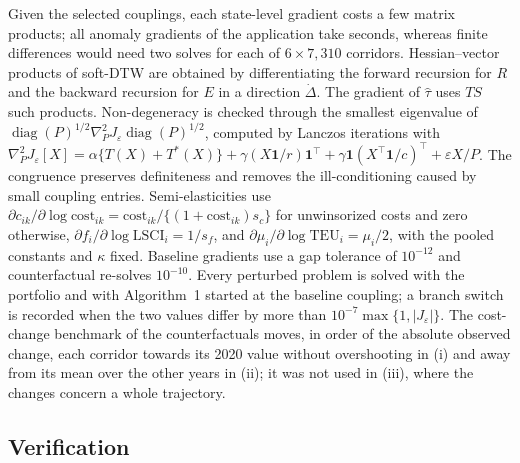 Given the selected couplings, each state-level gradient costs a few matrix products; all anomaly gradients of the application take seconds, whereas finite differences would need two solves for each of $6\times7{,}310$ corridors. Hessian--vector products of soft-DTW are obtained by differentiating the forward recursion for $R$ and the backward recursion for $E$ in a direction $\dot\Delta$. The gradient of $\hat\tau$ uses $TS$ such products. Non-degeneracy is checked through the smallest eigenvalue of $\operatorname{diag}(P)^{1/2}\nabla^2_PJ_\varepsilon\operatorname{diag}(P)^{1/2}$, computed by Lanczos iterations with $\nabla_P^2J_\varepsilon[X]=\alpha\{T(X)+T^\ast(X)\}+\gamma(X\mathbf 1/r)\mathbf 1^\top+\gamma\mathbf 1(X^\top\mathbf 1/c)^\top+\varepsilon X/P$. The congruence preserves definiteness and removes the ill-conditioning caused by small coupling entries. Semi-elasticities use $\partial c_{ik}/\partial\log\mathrm{cost}_{ik}=\mathrm{cost}_{ik}/\{(1+\mathrm{cost}_{ik})s_c\}$ for unwinsorized costs and zero otherwise, $\partial f_i/\partial\log\mathrm{LSCI}_i=1/s_f$, and $\partial\mu_i/\partial\log\mathrm{TEU}_i=\mu_i/2$, with the pooled constants and $\kappa$ fixed. Baseline gradients use a gap tolerance of $10^{-12}$ and counterfactual re-solves $10^{-10}$. Every perturbed problem is solved with the portfolio and with Algorithm~1 started at the baseline coupling; a branch switch is recorded when the two values differ by more than $10^{-7}\max\{1,|J_\varepsilon|\}$. The cost-change benchmark of the counterfactuals moves, in order of the absolute observed change, each corridor towards its 2020 value without overshooting in (i) and away from its mean over the other years in (ii); it was not used in (iii), where the changes concern a whole trajectory.

\subsection{Verification}\label{sec:sensverif}

